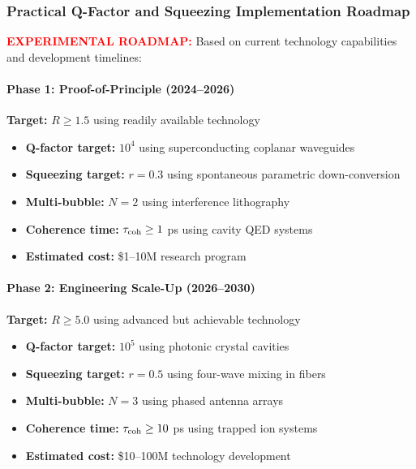 \documentclass[11pt]{article}
\begin{document}
\subsubsection*{Practical Q-Factor and Squeezing Implementation Roadmap}
\textcolor{red}{\textbf{EXPERIMENTAL ROADMAP:}} Based on current technology capabilities and development timelines:

\paragraph{Phase 1: Proof-of-Principle (2024--2026)}
\textbf{Target:} $R \geq 1.5$ using readily available technology
\begin{itemize}
  \item \textbf{Q-factor target:} $10^4$ using superconducting coplanar waveguides
  \item \textbf{Squeezing target:} $r = 0.3$ using spontaneous parametric down-conversion
  \item \textbf{Multi-bubble:} $N = 2$ using interference lithography
  \item \textbf{Coherence time:} $\tau_{\rm coh} \geq 1$ ps using cavity QED systems
  \item \textbf{Estimated cost:} \$1--10M research program
\end{itemize}

\paragraph{Phase 2: Engineering Scale-Up (2026--2030)}
\textbf{Target:} $R \geq 5.0$ using advanced but achievable technology
\begin{itemize}
  \item \textbf{Q-factor target:} $10^5$ using photonic crystal cavities
  \item \textbf{Squeezing target:} $r = 0.5$ using four-wave mixing in fibers
  \item \textbf{Multi-bubble:} $N = 3$ using phased antenna arrays
  \item \textbf{Coherence time:} $\tau_{\rm coh} \geq 10$ ps using trapped ion systems
  \item \textbf{Estimated cost:} \$10--100M technology development
\end{itemize}
\end{document}
